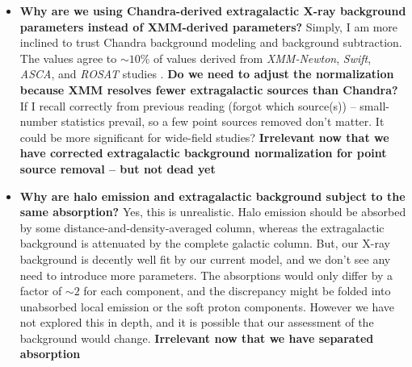\documentclass[preprint2,tighten,trackchanges]{aastex6}
\newcommand*{\abt}{\mathord{\sim}} %
\begin{document}
\begin{itemize}
    \item \textbf{Why are we using Chandra-derived extragalactic X-ray background
        parameters instead of XMM-derived parameters?}
        Simply, I am more inclined to trust Chandra background modeling and
        background subtraction.
        The \citet{hickox2006} values agree to $\abt 10\%$ of values derived
        from \textit{XMM-Newton}, \textit{Swift}, \textit{ASCA}, and
        \textit{ROSAT} studies
        \citep{chen1997, kushino2002, de-luca2004, moretti2009}.
        \textbf{Do we need to adjust the normalization because XMM resolves
        fewer extragalactic sources than Chandra?}
        If I recall correctly from previous reading (forgot which source(s)) --
        small-number statistics prevail, so a few point sources removed don't
        matter.  It could be more significant for wide-field studies?
        \textbf{Irrelevant now that we have corrected extragalactic background normalization for point source removal -- but not dead yet}
    \item \textbf{Why are halo emission and extragalactic background subject to
        the same absorption?}
        Yes, this is unrealistic.  Halo emission should be absorbed by some
        distance-and-density-averaged column, whereas the extragalactic
        background is attenuated by the complete galactic column.
        But, our X-ray background is decently well fit by our current model,
        and we don't see any need to introduce more parameters.
        The absorptions would only differ by a factor of $\abt 2$ for each
        component, and the discrepancy might be folded into unabsorbed local
        emission or the soft proton components.
        However we have not explored this in depth, and it is possible that our
        assessment of the background would change.
        \textbf{Irrelevant now that we have separated absorption}
\end{itemize}
\end{document}

